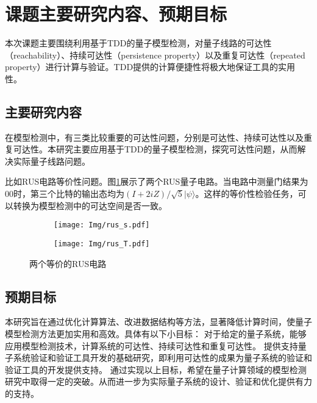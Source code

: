 \section{课题主要研究内容、预期目标}
本次课题主要围绕利用基于TDD的量子模型检测，对量子线路的可达性（reachability）、持续可达性（persistence property）以及重复可达性（repeated property）进行计算与验证。TDD提供的计算便捷性将极大地保证工具的实用性。
\subsection{主要研究内容}
在模型检测中，有三类比较重要的可达性问题，分别是可达性、持续可达性以及重复可达性。本研究主要应用基于TDD的量子模型检测，探究可达性问题，从而解决实际量子线路问题。

比如RUS电路等价性问题。图\ref{fig:rus-equal}展示了两个RUS量子电路。当电路中测量门结果为$00$时，第三个比特的输出态均为$\left(I+2iZ\right)/ \sqrt 5 |\psi\rangle$。这样的等价性检验任务，可以转换为模型检测中的可达空间是否一致。
\begin{figure}[!htbp]
	\centering
	\begin{subfigure}[b]{0.4\textwidth}
        \centering
        \texttt{[image: Img/rus\_s.pdf]}
	\end{subfigure}
	\qquad
	\begin{subfigure}[b]{0.4\textwidth}
        \centering
        \texttt{[image: Img/rus\_T.pdf]}
	\end{subfigure}
	\caption{两个等价的RUS电路\citep{Bocharov_2015}}
	\label{fig:rus-equal}
\end{figure}

\subsection{预期目标}
本研究旨在通过优化计算算法、改进数据结构等方法，显著降低计算时间，使量子模型检测方法更加实用和高效。具体有以下小目标：
	对于给定的量子系统，能够应用模型检测技术，计算系统的可达性、持续可达性和重复可达性。
	提供支持量子系统验证和验证工具开发的基础研究，即利用可达性的成果为量子系统的验证和验证工具的开发提供支持。
通过实现以上目标，希望在量子计算领域的模型检测研究中取得一定的突破。从而进一步为实际量子系统的设计、验证和优化提供有力的支持。
